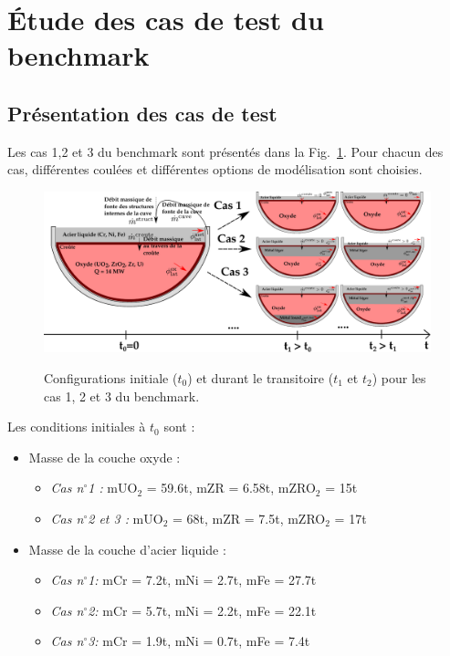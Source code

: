 \documentclass[3p]{elsarticle}
\begin{document}

\section{Étude des cas de test du benchmark}

\subsection{Présentation des cas de test}
Les cas 1,2 et 3 du benchmark sont présentés dans la Fig.~\ref{fig:TD_benchmark}. Pour chacun des cas, différentes coulées et différentes options de modélisation sont choisies. 
\begin{figure}[H]
  \centering \includegraphics[width=\textwidth]{../Figures/TD_benchmark.pdf}
	\label{fig:TD_benchmark}
  \caption{Configurations initiale ($t_0$) et durant le transitoire ($t_1$ et $t_2$) pour les cas 1, 2 et 3 du benchmark.}
\end{figure}
Les conditions initiales à $t_0$ sont :
\begin{itemize}
	\item Masse de la couche oxyde :
	\begin{itemize}
		\item \emph{Cas n$^{\circ}$1 :} mUO$_2$ = 59.6t,  mZR = 6.58t, mZRO$_2$ = 15t
		\item \emph{Cas n$^{\circ}$2 et 3 :} mUO$_2$ = 68t,  mZR = 7.5t, mZRO$_2$ = 17t
	\end{itemize}
	\item Masse de la couche d'acier liquide :
	\begin{itemize}
		\item \emph{Cas n$^{\circ}$1:} mCr = 7.2t,  mNi = 2.7t, mFe = 27.7t
		\item \emph{Cas n$^{\circ}$2:} mCr = 5.7t,  mNi = 2.2t, mFe = 22.1t	
		\item \emph{Cas n$^{\circ}$3:} mCr = 1.9t,  mNi = 0.7t, mFe = 7.4t
	\end{itemize}
\end{itemize}
\end{document}

